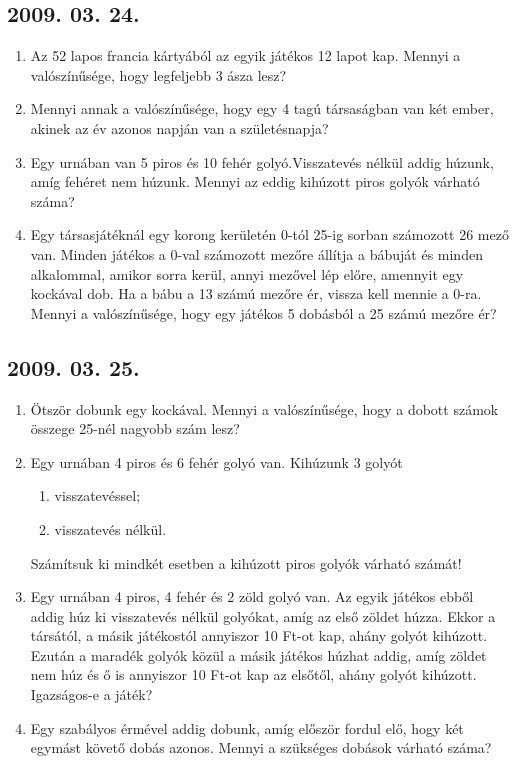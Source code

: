 \documentclass{article}
\newenvironment{abc}{\begin{enumerate}[label=\textit{\alph*})]}{\end{enumerate}}
\begin{document}
\subsection*{2009. 03. 24.}
\begin{enumerate}
\item Az 52 lapos francia kártyából az egyik játékos 12 lapot kap. Mennyi a valószínűsége, hogy legfeljebb 3 ásza lesz?

\item Mennyi annak a valószínűsége, hogy egy 4 tagú társaságban van két ember, akinek az év azonos napján van a születésnapja?

\item Egy urnában van 5 piros és 10 fehér golyó.Visszatevés nélkül addig húzunk, amíg fehéret nem húzunk. Mennyi az eddig kihúzott piros golyók várható száma?

\item Egy társasjátéknál egy korong kerületén 0-tól 25-ig sorban számozott 26 mező van. Minden játékos a 0-val számozott mezőre állítja a bábuját és minden alkalommal, amikor sorra kerül, annyi mezővel lép előre, amennyit egy kockával dob. Ha a bábu a 13 számú mezőre ér, vissza kell mennie a 0-ra. Mennyi a valószínűsége, hogy egy játékos 5 dobásból a 25 számú mezőre ér?
\end{enumerate}
\subsection*{2009. 03. 25.}
\begin{enumerate}
\item Ötször dobunk egy kockával. Mennyi a valószínűsége, hogy a dobott számok összege 25-nél nagyobb szám lesz?

\item Egy urnában 4 piros és 6 fehér golyó van. Kihúzunk 3 golyót
\begin{abc}
\item visszatevéssel;
\item visszatevés nélkül.
\end{abc}
Számítsuk ki mindkét esetben a kihúzott piros golyók várható számát!

\item Egy urnában 4 piros, 4 fehér és 2 zöld golyó van. Az egyik játékos ebből addig húz ki visszatevés nélkül golyókat, amíg az első zöldet húzza. Ekkor a társától, a másik játékostól annyiszor 10 Ft-ot kap, ahány golyót kihúzott. Ezután a maradék golyók közül a másik játékos húzhat addig, amíg zöldet nem húz és ő is annyiszor 10 Ft-ot kap az elsőtől, ahány golyót kihúzott. Igazságos-e a játék?

\item Egy szabályos érmével addig dobunk, amíg először fordul elő, hogy két egymást követő dobás azonos. Mennyi a szükséges dobások várható száma?
\end{enumerate}
\end{document}
